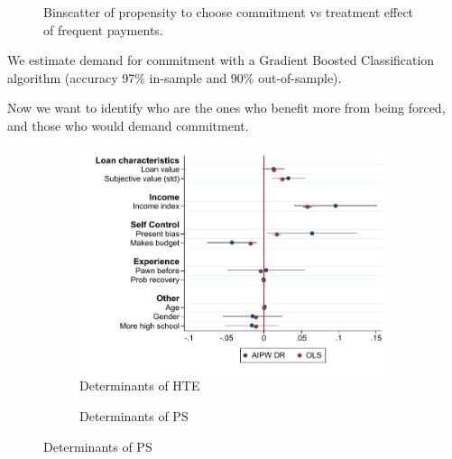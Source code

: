 \documentclass[oneside,11pt]{article}
\begin{document}
\begin{figure}[H]
\begin{center}
    \end{center}
     \scriptsize    Binscatter of propensity to choose commitment vs treatment effect of frequent payments.
\end{figure}



We estimate demand for commitment with a Gradient Boosted Classification algorithm (accuracy 97\% in-sample and 90\% out-of-sample).


Now we want to identify who are the ones who benefit more from being forced, and those who would demand commitment.


\begin{figure}[H]
    \caption{}
    \label{}
    \begin{center}
    \begin{subfigure}{0.475\textwidth}
        \caption{Determinants of HTE}
        \centering
        \includegraphics[width=\textwidth]{Figuras/HE/he_int_vertical_eff_cost_loan_pro_2.pdf}
    \end{subfigure}
    \begin{subfigure}{0.475\textwidth}
        \caption{Determinants of PS}
        \centering

\end{subfigure}
\end{center}
\end{figure}
\end{document}
